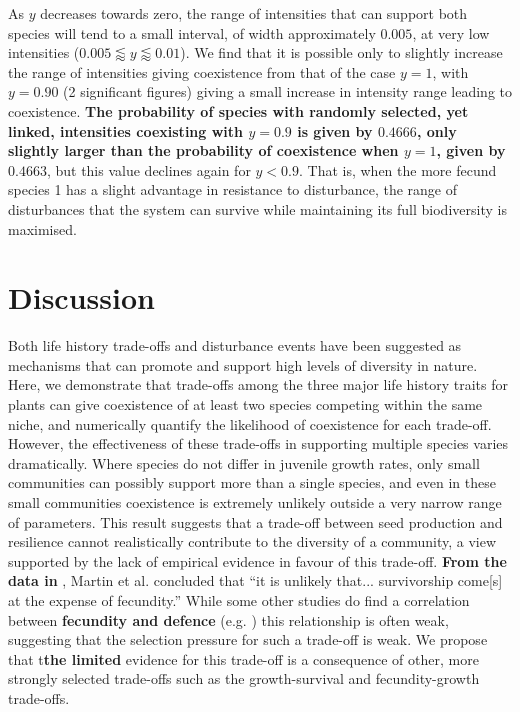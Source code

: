 As $y$ decreases towards zero, the range of intensities that can support both species will tend to a small interval, of width approximately $0.005$, at very low intensities ($0.005\lessapprox y \lessapprox 0.01$). We find that it is possible only to slightly increase the range of intensities giving coexistence from that of the case $y=1$, with $y=0.90$ (2 significant figures) giving a small increase in intensity range leading to coexistence. \textbf{The probability of species with randomly selected, yet linked, intensities coexisting with $y=0.9$ is given by $0.4666$, only slightly larger than the probability of coexistence when $y=1$, given by $0.4663$}, but this value declines again for $y<0.9$. That is, when the more fecund species 1 has a slight advantage in resistance to disturbance, the range of disturbances that the system can survive while maintaining its full biodiversity is maximised.

\section{Discussion}
Both life history trade-offs and disturbance events have been suggested as mechanisms that can promote and support high levels of diversity in nature. Here, we demonstrate that trade-offs among the three major life history traits for plants can give coexistence of at least two species competing within the same niche, and numerically quantify the likelihood of coexistence for each trade-off. However, the effectiveness of these trade-offs in supporting multiple species varies dramatically. Where species do not differ in juvenile growth rates, only small communities can possibly support more than a single species, and even in these small communities coexistence is extremely unlikely outside a very narrow range of parameters. This result suggests that a trade-off between seed production and resilience cannot realistically contribute to the diversity of a community, a view supported by the lack of empirical evidence in favour of this trade-off. \textbf{From the data in} \cite{martin2010dispersal}, Martin et al. \cite{martin2010divergence} concluded that ``it is unlikely that... survivorship come[s] at the expense of fecundity.'' While some other studies do find a correlation between \textbf{fecundity and defence} (e.g. \cite{marquis1984leaf,gwynn2005resistance}) this relationship is often weak, suggesting that the selection pressure for such a trade-off is weak. We propose that t\textbf{the limited} evidence for this trade-off is a consequence of other, more strongly selected trade-offs such as the growth-survival and fecundity-growth trade-offs.

